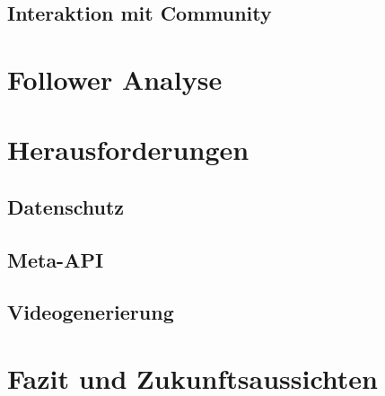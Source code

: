\documentclass[a4paper,12pt]{article}
\begin{document}
\subsection{Interaktion mit Community}

\section{Follower Analyse}

\section{Herausforderungen}
\subsection{Datenschutz}
\subsection{Meta-API}
\subsection{Videogenerierung}

\section{Fazit und Zukunftsaussichten}
\end{document}
